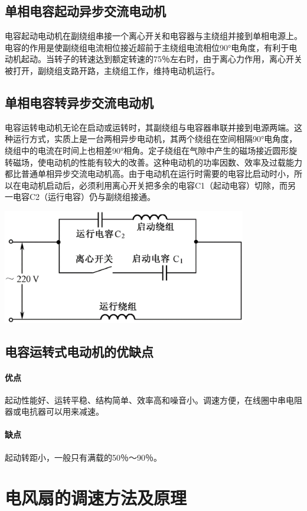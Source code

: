 \documentclass[a4paper,11pt]{ctexart}
\begin{document}
\subsection{单相电容起动异步交流电动机}
电容起动电动机在副绕组串接一个离心开关和电容器与主绕组并接到单相电源上。电容的作用是使副绕组电流相位接近超前于主绕组电流相位90°电角度，有利于电动机起动。当转子的转速达到额定转速的75％左右时，由于离心力作用，离心开关被打开，副绕组支路开路，主绕组工作，维持电动机运行。
\subsection{单相电容转异步交流电动机}
电容运转电动机无论在启动或运转时，其副绕组与电容器串联并接到电源两端。这种运行方式，实质上是一台两相异步电动机，其两个绕组在空间相隔90°电角度，绕组中的电流在时间上也相差90°相角。定子绕组在气隙中产生的磁场接近圆形旋转磁场，使电动机的性能有较大的改善。这种电动机的功率因数、效率及过载能力都比普通单相异步交流电动机高。由于电动机在运行时需要的电容比启动时小，所以在电动机启动后，必须利用离心开关把多余的电容C1（起动电容）切除，而另一电容C2（运行电容）仍与副绕组接通。
\begin{center}
\includegraphics[width=0.8\textwidth]{./images/pic_1.eps}
\end{center}
\subsection{电容运转式电动机的优缺点}
\paragraph{优点}起动性能好、运转平稳、结构简单、效率高和噪音小。调速方便，在线圈中串电阻器或电抗器可以用来减速。
\paragraph{缺点}起动转距小，一般只有满载的50％～90％。

\section{电风扇的调速方法及原理}
\end{document}
